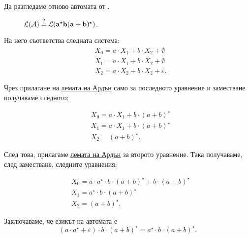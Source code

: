 \begin{example}
Да разгледаме отново автомата от .

\begin{figure}[H]
  \begin{center}
  \end{center}
  \caption{$\mathcal{L}(\mathcal{A}) \stackrel{?}{=} \mathcal{L}(\mathbf{a^\star b(a+b)^\star})$.}
\end{figure}

На него съответства следната система:
\begin{align*}
  & X_0 = a \cdot X_1 + b \cdot X_2 + \emptyset\\
  & X_1 = a \cdot X_1 + b \cdot X_2 + \emptyset\\
  & X_2 = a \cdot X_2 + b \cdot X_2 + \varepsilon.
\end{align*}

Чрез прилагане на \hyperref[lem:regular:system:arden]{лемата на Ардън} само за последното уравнение и заместване получаваме следното:

\begin{align*}
  & X_0 = a \cdot X_1 + b \cdot (a+b)^\star\\
  & X_1 = a \cdot X_1 + b \cdot (a+b)^\star\\
  & X_2 = (a+b)^\star.
\end{align*}

След това, прилагаме \hyperref[lem:regular:system:arden]{лемата на Ардън} за второто уравнение. Така получаваме, след заместване, следните уравнения:

\begin{align*}
  & X_0 = a \cdot a^\star \cdot b \cdot (a+b)^\star + b \cdot (a+b)^\star\\
  & X_1 = a^\star \cdot b \cdot (a+b)^\star\\
  & X_2 = (a+b)^\star.
\end{align*}

Заключаваме, че езикът на автомата е
\[(a \cdot a^\star + \varepsilon) \cdot b \cdot (a+b)^\star = a^\star \cdot b \cdot (a+b)^\star.\]
  
\end{example}



